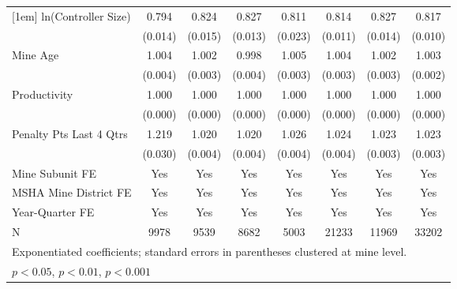 {\begin{tabular}{l*{7}{c}}
[1em]
ln(Controller Size)      &       0.794\sym{***}&       0.824\sym{***}&       0.827\sym{***}&       0.811\sym{***}&       0.814\sym{***}&       0.827\sym{***}&       0.817\sym{***}\\
                         &     (0.014)         &     (0.015)         &     (0.013)         &     (0.023)         &     (0.011)         &     (0.014)         &     (0.010)         \\
[1em]
Mine Age                 &       1.004         &       1.002         &       0.998         &       1.005         &       1.004         &       1.002         &       1.003         \\
                         &     (0.004)         &     (0.003)         &     (0.004)         &     (0.003)         &     (0.003)         &     (0.003)         &     (0.002)         \\
[1em]
Productivity             &       1.000\sym{**} &       1.000\sym{***}&       1.000\sym{*}  &       1.000\sym{**} &       1.000\sym{***}&       1.000\sym{***}&       1.000\sym{***}\\
                         &     (0.000)         &     (0.000)         &     (0.000)         &     (0.000)         &     (0.000)         &     (0.000)         &     (0.000)         \\
[1em]
Penalty Pts Last 4 Qtrs  &       1.219\sym{***}&       1.020\sym{***}&       1.020\sym{***}&       1.026\sym{***}&       1.024\sym{***}&       1.023\sym{***}&       1.023\sym{***}\\
                         &     (0.030)         &     (0.004)         &     (0.004)         &     (0.004)         &     (0.004)         &     (0.003)         &     (0.003)         \\
[1em]
Mine Subunit FE          &         Yes         &         Yes         &         Yes         &         Yes         &         Yes         &         Yes         &         Yes         \\
[1em]
MSHA Mine District FE    &         Yes         &         Yes         &         Yes         &         Yes         &         Yes         &         Yes         &         Yes         \\
[1em]
Year-Quarter FE          &         Yes         &         Yes         &         Yes         &         Yes         &         Yes         &         Yes         &         Yes         \\
\hline
N                        &        9978         &        9539         &        8682         &        5003         &       21233         &       11969         &       33202         \\
\hline\hline
\multicolumn{8}{l}{\footnotesize Exponentiated coefficients; standard errors in parentheses clustered at mine level.}\\
\multicolumn{8}{l}{\footnotesize \sym{*} \(p<0.05\), \sym{**} \(p<0.01\), \sym{***} \(p<0.001\)}\\
\end{tabular}
}

